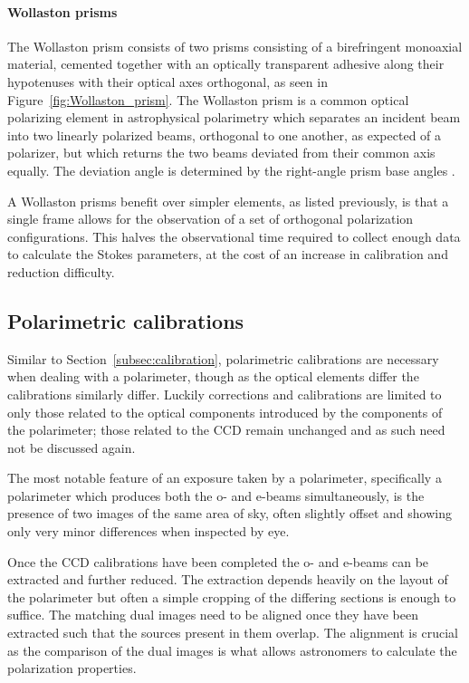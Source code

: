 \paragraph{Wollaston prisms}
The Wollaston prism consists of two prisms consisting of a birefringent monoaxial material, cemented together with an optically transparent adhesive along their hypotenuses with their optical axes orthogonal, as seen in Figure~\ref{fig:Wollaston_prism}. The Wollaston prism is a common optical polarizing element in astrophysical polarimetry which separates an incident beam into two linearly polarized beams, orthogonal to one another, as expected of a polarizer, but which returns the two beams deviated from their common axis equally. The deviation angle is determined by the right-angle prism base angles \citep{wollaston}.
\prgph

A Wollaston prisms benefit over simpler elements, as listed previously, is that a single frame allows for the observation of a set of orthogonal polarization configurations. This halves the observational time required to collect enough data to calculate the Stokes parameters, at the cost of an increase in calibration and reduction difficulty.

\subsection{Polarimetric calibrations}

Similar to Section~\ref{subsec:calibration}, polarimetric calibrations are necessary when dealing with a polarimeter, though as the optical elements differ the calibrations similarly differ. Luckily corrections and calibrations are limited to only those related to the optical components introduced by the components of the polarimeter; those related to the \gls{CCD} remain unchanged and as such need not be discussed again.
\prgph

The most notable feature of an exposure taken by a polarimeter, specifically a polarimeter which produces both the o- and e-beams simultaneously, is the presence of two images of the same area of sky, often slightly offset and showing only very minor differences when inspected by eye.
\prgph

Once the \gls{CCD} calibrations have been completed the o- and e-beams can be extracted and further reduced. The extraction depends heavily on the layout of the polarimeter but often a simple cropping of the differing sections is enough to suffice. The matching dual images need to be aligned once they have been extracted such that the sources present in them overlap. The alignment is crucial as the comparison of the dual images is what allows astronomers to calculate the polarization properties.
\prgph

